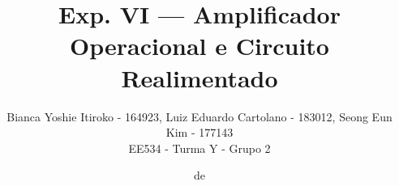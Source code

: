 \documentclass{pack}
\begin{document}
    \title{Exp. VI — Amplificador Operacional e Circuito Realimentado}
    \author{Bianca Yoshie Itiroko - 164923, Luiz Eduardo Cartolano - 183012, Seong Eun Kim - 177143 \\ EE534 - Turma Y - Grupo 2}
    \date{\MONTH de \the\year}
    
    \maketitle
    
    
    
    
    
    
    
    \nocite{*}
    
    
    
    \newpage
    
    
    
    
\end{document}
